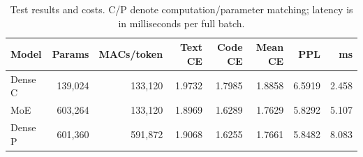 \begin{table}[ht]
\centering
\small
\caption{Test results and costs. C/P denote computation/parameter matching; latency is in milliseconds per full batch.}
\label{tab:language-results}
\begin{tabular}{@{}lrrrrrrr@{}}
\toprule
Model & Params & MACs/token & Text CE & Code CE & Mean CE & PPL & ms \\
\midrule
Dense C & 139,024 & 133,120 & 1.9732 & 1.7985 & 1.8858 & 6.5919 & 2.458 \\
MoE & 603,264 & 133,120 & 1.8969 & 1.6289 & 1.7629 & 5.8292 & 5.107 \\
Dense P & 601,360 & 591,872 & 1.9068 & 1.6255 & 1.7661 & 5.8482 & 8.083 \\
\bottomrule
\end{tabular}
\end{table}
